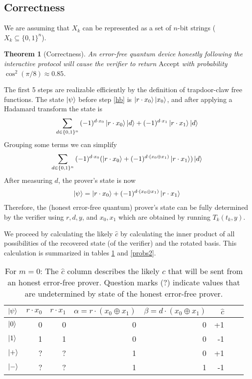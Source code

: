 \documentclass{article}
\newtheorem{thm}{Theorem}
\begin{document}
\subsection{Correctness}
We are assuming that $X_{k}$ can be represented as a set of $n$-bit strings ($X_{k}\subseteq\{0,1\}^{n}$).

\begin{thm}[Correctness]
An error-free quantum device honestly following the interactive protocol will cause the verifier to return $\mathrm{Accept}$ with probability $\cos^{2}(\pi/8)\approx 0.85$.
\end{thm}
The first 5 steps are realizable efficiently by the definition of trapdoor-claw free functions. 
The state $\ket{\psi}$ before step \ref{hb} is $\ket{r\cdot x_{0}}\ket{x_{0}}$, and after applying a Hadamard transform the state is \begin{align}\sum_{d \in \{0,1\}^{n}}{(-1)^{d\cdot x_{0}}\ket{r\cdot x_{0}}\ket{d}+(-1)^{d\cdot x_{1}}\ket{r\cdot x_{1}}\ket{d}}\end{align}  Grouping some terms we can simplify
\begin{align}\sum_{d \in \{0,1\}^{n}}{(-1)^{d\cdot x_{0}}(\ket{r\cdot x_{0}}+(-1)^{d\cdot (x_{0}\oplus x_{1})}\ket{r\cdot x_{1}})\ket{d}}\end{align} After measuring $d$, the prover's state is now \begin{align}\ket{\psi}=\ket{r\cdot x_{0}} + (-1)^{d\cdot (x_{0}\oplus x_{1})}\ket{r\cdot x_{1}}\end{align}  Therefore, the (honest error-free quantum) prover's state can be fully determined by the verifier using $r,d,y$, and $x_{0},x_{1}$ which are obtained by running $T_{k}(t_{k},y)$.

We proceed by calculating the likely $\hat{c}$ by calculating the inner product of all possibilities of the recovered state (of the verifier) and the rotated basis. This calculation is summarized in tables \ref{probs1} and \ref{probs2}.

\begin{table}[ht]
  \centering
  \begin{tabular}{|l|r|r|r|r|r|r|r|}
    \hline
    $\ket{\psi}$ & 
    $r\cdot x_{0}$ & $r\cdot x_{1}$ & $\alpha=r\cdot (x_{0}\oplus x_{1})$ &  $\beta=d\cdot (x_{0}\oplus x_{1})$ &
    $\hat{c}$ \\
    \hline
    $\ket{0}$   & 0 & 0 & 0 & 0 & +1  \\
    $\ket{1}$  & 1 & 1 & 0 & 0 & -1 \\
    $\ket{+}$  & ? & ? & 1 & 0 & +1 \\
    $\ket{-}$   & ? & ? & 1 & 1 & -1\\
    \hline
  \end{tabular}
  
\caption{For $m = 0$: The $\hat{c}$ column describes the likely $c$ that will be sent from an honest error-free prover. Question marks (?) indicate values that are undetermined by state of the honest error-free prover.}
\label{probs1}

\end{table}
\end{document}
